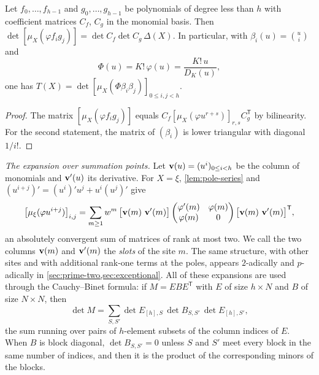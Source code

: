 \begin{lemma}\label{lem:change-of-basis}
Let $f_0,\dots,f_{h-1}$ and $g_0,\dots,g_{h-1}$ be polynomials of degree less than $h$ with
coefficient matrices $C_f$, $C_g$ in the monomial basis. Then
$\det[\mu_X(\varphi f_ig_j)]=\det C_f\det C_g\,\Delta(X)$. In particular, with
$\beta_i(u)=\binom ui$ and
\begin{equation}\label{eq:Phi}
  \Phi(u)=K!\,\varphi(u)=\frac{K!\,u}{D_K(u)},
\end{equation}
one has $T(X)=\det[\mu_X(\Phi\beta_i\beta_j)]_{0\le i,j<h}$.
\end{lemma}

\begin{proof}
The matrix $[\mu_X(\varphi f_ig_j)]$ equals $C_f[\mu_X(\varphi u^{r+s})]_{r,s}C_g^{\mathsf T}$
by bilinearity. For the second statement, the matrix of $(\beta_i)$ is lower triangular with
diagonal $1/i!$.
\end{proof}

\emph{The expansion over summation points.} Let $\mathbf{v}(u)=(u^i)_{0\le i<h}$ be the column of monomials and $\mathbf{v}'(u)$ its derivative. For
$X=\xi$, \cref{lem:pole-series} and $(u^{i+j})'=(u^i)'u^j+u^i(u^j)'$ give
\begin{equation}\label{eq:real-sites}
  \bigl[\mu_\xi(\varphi u^{i+j})\bigr]_{i,j}
  =\sum_{m\ge1}w^m\,\bigl[\mathbf{v}(m)\ \mathbf{v}'(m)\bigr]
  \begin{pmatrix}\varphi'(m)&\varphi(m)\\ \varphi(m)&0\end{pmatrix}
  \bigl[\mathbf{v}(m)\ \mathbf{v}'(m)\bigr]^{\mathsf T},
\end{equation}
an absolutely convergent sum of matrices of rank at most two. We call the two columns
$\mathbf{v}(m)$ and $\mathbf{v}'(m)$ the \emph{slots} of the site $m$. The same structure, with other
sites and with additional rank-one terms at the poles, appears $2$-adically and $p$-adically in
\cref{sec:prime-two,sec:exceptional}. All of these expansions are used through the
Cauchy--Binet formula: if $M=EBE^{\mathsf T}$ with $E$ of size $h\times N$ and $B$ of size
$N\times N$, then
\begin{equation}\label{eq:cauchy-binet}
  \det M=\sum_{S,S'}\det E_{[h],S}\,\det B_{S,S'}\,\det E_{[h],S'},
\end{equation}
the sum running over pairs of $h$-element subsets of the column indices of $E$. When $B$ is
block diagonal, $\det B_{S,S'}=0$ unless $S$ and $S'$ meet every block in the same number of
indices, and then it is the product of the corresponding minors of the blocks.

